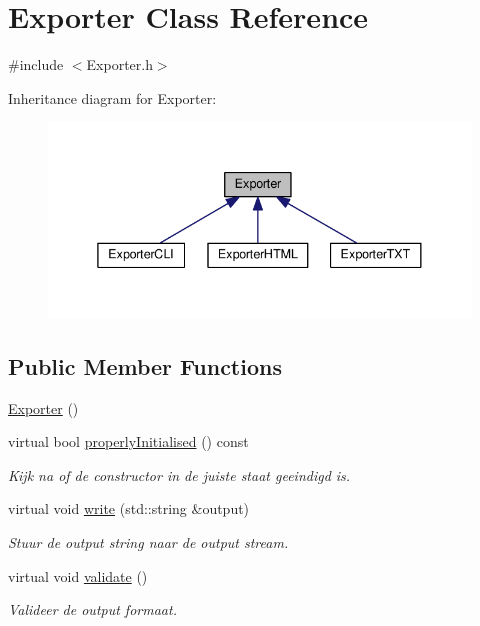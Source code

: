 \hypertarget{class_exporter}{}\section{Exporter Class Reference}
\label{class_exporter}


{\ttfamily \#include $<$Exporter.\+h$>$}



Inheritance diagram for Exporter\+:
\nopagebreak
\begin{figure}[H]
\begin{center}
\leavevmode
\includegraphics[width=338pt]{class_exporter__inherit__graph}
\end{center}
\end{figure}
\subsection*{Public Member Functions}
\begin{DoxyCompactItemize}
\item 
\hyperlink{class_exporter_a2a977cb5ac8f637fcb570e73f650eca0}{Exporter} ()
\item 
virtual bool \hyperlink{class_exporter_afb6185b8276c2fd03da53f49e4da295b}{properly\+Initialised} () const
\begin{DoxyCompactList}\small\item\em Kijk na of de constructor in de juiste staat geeindigd is. \end{DoxyCompactList}\item 
virtual void \hyperlink{class_exporter_a96a1f764ef33d11d118f3170a3ca7e1a}{write} (std\+::string \&output)
\begin{DoxyCompactList}\small\item\em Stuur de output string naar de output stream. \end{DoxyCompactList}\item 
virtual void \hyperlink{class_exporter_a585f97d4204275edcb831df9215a0099}{validate} ()
\begin{DoxyCompactList}\small\item\em Valideer de output formaat. \end{DoxyCompactList}\end{DoxyCompactItemize}


